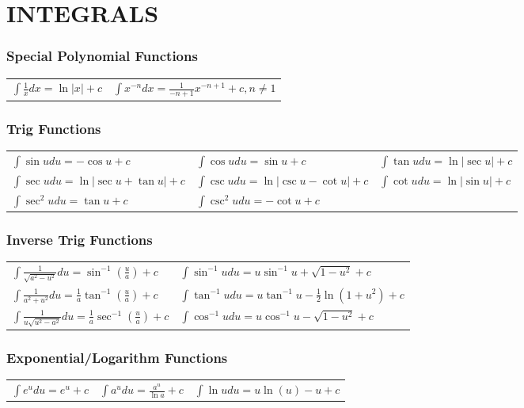 \section{INTEGRALS}
\subsubsection{Special Polynomial Functions}

\begin{tabular}{m{7cm} m}
   $\int \frac{1}{x} d x=\ln |x|+c$ & $\int x^{-n} d x=\frac{1}{-n+1} x^{-n+1}+c, n \neq 1$
\end{tabular}

\subsubsection{Trig Functions}

\begin{tabular}{m{5.5cm} m{5.5cm} m}
   $\int \sin u d u=-\cos u+c$ & $\int \cos u d u=\sin u+c$ & $\int \tan u d u=\ln |\sec u|+c$ \\
   $\int \sec u d u=\ln |\sec u+\tan u|+c$ & $\int \csc u d u=\ln |\csc u-\cot u|+c$ & $\int \cot u d u=\ln |\sin u|+c$\\
   $\int \sec^2 u d u=\tan u+c$ & $\int \csc ^2 u d u=-\cot u+c$ & 
\end{tabular}

\subsubsection{Inverse Trig Functions}

\begin{tabular}{m{7cm} m}
    $\int \frac{1}{\sqrt{a^2-u^2}} d u=\sin ^{-1}\left(\frac{u}{a}\right)+c$ & $\int \sin ^{-1} u d u=u \sin ^{-1} u+\sqrt{1-u^2}+c$ \\
    $\int \frac{1}{a^2+u^2} d u=\frac{1}{a} \tan ^{-1}\left(\frac{u}{a}\right)+c$ & $\int \tan ^{-1} u d u=u \tan ^{-1} u-\frac{1}{2} \ln \left(1+u^2\right)+c$\\
    $\int \frac{1}{u \sqrt{u^2-a^2}} d u=\frac{1}{a} \sec ^{-1}\left(\frac{u}{a}\right)+c$ & $\int \cos ^{-1} u d u=u \cos ^{-1} u-\sqrt{1-u^2}+c$
\end{tabular}

\subsubsection{Exponential/Logarithm Functions}

\begin{tabular}{m{5cm} m{5cm} m}
    $\int e^u d u=e^u+c$ & $\int a^u d u=\frac{a^u}{\ln a}+c$ & $\int \ln u d u=u \ln (u)-u+c$
\end{tabular}